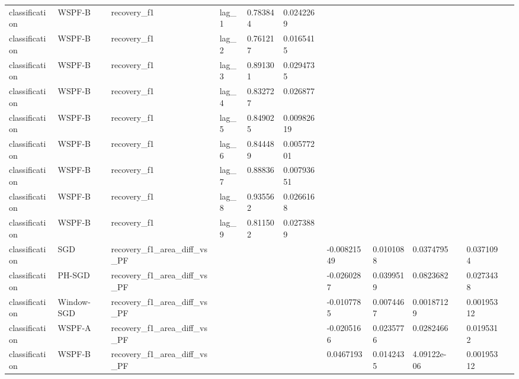 \begin{tabular}{llllllllllll}
classification & WSPF-B & recovery\_f1 & lag\_1 & 0.783844 & 0.0242269 &  &  &  &  &  &  \\
classification & WSPF-B & recovery\_f1 & lag\_2 & 0.761217 & 0.0165415 &  &  &  &  &  &  \\
classification & WSPF-B & recovery\_f1 & lag\_3 & 0.891301 & 0.0294735 &  &  &  &  &  &  \\
classification & WSPF-B & recovery\_f1 & lag\_4 & 0.832727 & 0.026877 &  &  &  &  &  &  \\
classification & WSPF-B & recovery\_f1 & lag\_5 & 0.849025 & 0.00982619 &  &  &  &  &  &  \\
classification & WSPF-B & recovery\_f1 & lag\_6 & 0.844489 & 0.00577201 &  &  &  &  &  &  \\
classification & WSPF-B & recovery\_f1 & lag\_7 & 0.88836 & 0.00793651 &  &  &  &  &  &  \\
classification & WSPF-B & recovery\_f1 & lag\_8 & 0.935562 & 0.0266168 &  &  &  &  &  &  \\
classification & WSPF-B & recovery\_f1 & lag\_9 & 0.811502 & 0.0273889 &  &  &  &  &  &  \\
classification & SGD & recovery\_f1\_area\_diff\_vs\_PF &  &  &  & -0.00821549 & 0.0101088 & 0.0374795 &  & 0.0371094 &  \\
classification & PH-SGD & recovery\_f1\_area\_diff\_vs\_PF &  &  &  & -0.0260287 & 0.0399519 & 0.0823682 &  & 0.0273438 &  \\
classification & Window-SGD & recovery\_f1\_area\_diff\_vs\_PF &  &  &  & -0.0107785 & 0.0074467 & 0.00187129 &  & 0.00195312 &  \\
classification & WSPF-A & recovery\_f1\_area\_diff\_vs\_PF &  &  &  & -0.0205166 & 0.0235776 & 0.0282466 &  & 0.0195312 &  \\
classification & WSPF-B & recovery\_f1\_area\_diff\_vs\_PF &  &  &  & 0.0467193 & 0.0142435 & 4.09122e-06 &  & 0.00195312 &  \\
\hline
\end{tabular}
